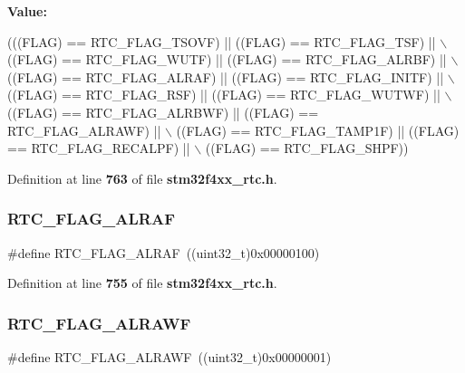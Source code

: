 {\bfseries Value\+:}
\begin{DoxyCode}
(((FLAG) == RTC_FLAG_TSOVF) || ((FLAG) == RTC_FLAG_TSF) || \(\backslash\)
                               ((FLAG) == RTC_FLAG_WUTF) || ((FLAG) == 
      RTC_FLAG_ALRBF) || \(\backslash\)
                               ((FLAG) == RTC_FLAG_ALRAF) || ((FLAG) == 
      RTC_FLAG_INITF) || \(\backslash\)
                               ((FLAG) == RTC_FLAG_RSF) || ((FLAG) == 
      RTC_FLAG_WUTWF) || \(\backslash\)
                               ((FLAG) == RTC_FLAG_ALRBWF) || ((FLAG) == 
      RTC_FLAG_ALRAWF) || \(\backslash\)
                               ((FLAG) == RTC_FLAG_TAMP1F) || ((FLAG) == 
      RTC_FLAG_RECALPF) || \(\backslash\)
                                ((FLAG) == RTC_FLAG_SHPF))
\end{DoxyCode}


Definition at line \textbf{ 763} of file \textbf{ stm32f4xx\+\_\+rtc.\+h}.

\mbox{\label{group__RTC__Flags__Definitions_gaf9e1a4b5eedd674d7b35ae334877ba12}} 
\subsubsection{R\+T\+C\+\_\+\+F\+L\+A\+G\+\_\+\+A\+L\+R\+AF}
{\footnotesize\ttfamily \#define R\+T\+C\+\_\+\+F\+L\+A\+G\+\_\+\+A\+L\+R\+AF~((uint32\+\_\+t)0x00000100)}



Definition at line \textbf{ 755} of file \textbf{ stm32f4xx\+\_\+rtc.\+h}.

\mbox{\label{group__RTC__Flags__Definitions_gaf4913efa96d03ded991b1cdddd6b7823}} 
\subsubsection{R\+T\+C\+\_\+\+F\+L\+A\+G\+\_\+\+A\+L\+R\+A\+WF}
{\footnotesize\ttfamily \#define R\+T\+C\+\_\+\+F\+L\+A\+G\+\_\+\+A\+L\+R\+A\+WF~((uint32\+\_\+t)0x00000001)}




